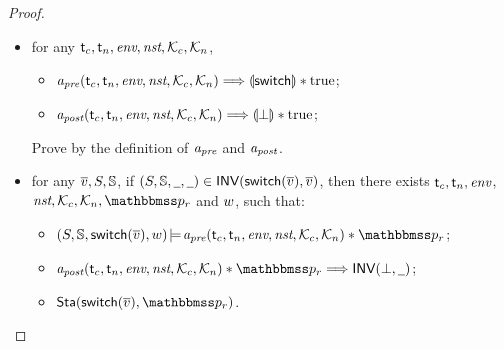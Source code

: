 \begin{proof}
\begin{itemize}
        \item for any $\textsf{t}_c, \textsf{t}_n, \textit{env}, \textit{nst}, \mathcal{K}_c, \mathcal{K}_n$,
            \begin{itemize}
                \small
                \item $\textit{a}_\textit{pre}(\textsf{t}_c, \textsf{t}_n, \textit{env}, \textit{nst}, \mathcal{K}_c, \mathcal{K}_n) 
                    \Longrightarrow \llparenthesis {\mathsf{switch}} \rrparenthesis * \text{true}$; 
                \item $\textit{a}_\textit{post}(\textsf{t}_c, \textsf{t}_n, \textit{env}, \textit{nst}, \mathcal{K}_c, \mathcal{K}_n) 
                    \Longrightarrow \llparenthesis {\perp} \rrparenthesis * \text{true}$; 
            \end{itemize}   
        \vspace*{0.3em}
        Prove by the definition of $\textit{a}_\textit{pre}$ and $\textit{a}_\textit{post}$.

        \item for any $\overline{v}, S, \mathbb{S}$, 
        if $(S, \mathbb{S}, \underline{\ \,}, \underline{\ \,}) \in 
            \textsf{INV}{(\mathsf{switch}(\overline{v}), \overline{v})}$, 
        then there exists $\textsf{t}_c, \textsf{t}_n, \textit{env}$, $\nst, 
        \hthrdlocalst_c, \hthrdlocalst_n, \relastP_r$ and $w$, 
        such that:
        \begin{itemize}
            \small
            \item $\asrtmodel{(\state, \hpstate, \primsw(\args{\val}), \word)}
                {\Apre(\thrdid_c, \thrdid_n, \env, \nst, \hthrdlocalst_c, 
                \hthrdlocalst_n) \sepstar \relastP_r}$; 
            \item  $\Apost(\thrdid_c, \thrdid_n, \env, \nst, \hthrdlocalst_c, 
                \hthrdlocalst_n) \sepstar \relastP_r \Longrightarrow 
                \INV{(\primdone, \notCare)}$; 
            \item $\Sta(\primsw(\args{\val}), \relastP_r)$. 
        \end{itemize}


\end{itemize}
\end{proof}
